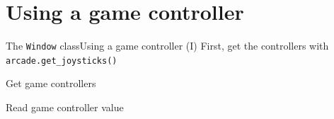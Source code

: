 \documentclass[10pt,compress]{beamer} %
\begin{document}
\section{Using a game controller}

\begin{frame}{The \texttt{Window} class}{Using a game controller (I)}
	First, get the controllers with \texttt{arcade.get\_joysticks()}
	\begin{exampleblock}{Get game controllers}
		\vspace{-0.2cm}
		
		\vspace{-0.2cm}
	\end{exampleblock}

	\begin{exampleblock}{Read game controller value}
		\vspace{-0.2cm}
		
		\vspace{-0.2cm}
	\end{exampleblock}	
\end{frame}
\end{document}
